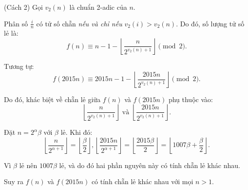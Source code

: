 \documentclass[../06-largest-exponent.tex]{subfiles}
\begin{document}
\begin{soln}(Cách 2)\footnotemark
	Gọi $v_2(n)$ là chuẩn 2-adic của $n$. 
    
	Phân số $\frac{i}{n}$ có tử số chẵn \textit{nếu và chỉ nếu} $v_2(i) > v_2(n)$.
	Do đó, số lượng tử số lẻ là:
	\[
		f(n) \equiv n - 1 - \left\lfloor \frac{n}{2^{v_2(n)+1}} \right\rfloor \pmod{2}.
	\]
        
	Tương tự:
	\[
		f(2015n) \equiv 2015n - 1 - \left\lfloor \frac{2015n}{2^{v_2(n)+1}} \right\rfloor \pmod{2}.
	\]
    
	Do đó, khác biệt về chẵn lẻ giữa $f(n)$ và $f(2015n)$ phụ thuộc vào:
	\[
		\left\lfloor \frac{n}{2^{v_2(n)+1}} \right\rfloor \text{ và } \left\lfloor \frac{2015n}{2^{v_2(n)+1}} \right\rfloor.
	\]

    Đặt $n = 2^\alpha \beta$ với $\beta$ lẻ. Khi đó:
    \[
        \left\lfloor \frac{n}{2^{\alpha + 1}} \right\rfloor = \left\lfloor \frac{\beta}{2} \right\rfloor,
        \left\lfloor \frac{2015n}{2^{\alpha + 1}} \right\rfloor = \left\lfloor \frac{2015\beta}{2} \right\rfloor = \left\lfloor 1007\beta + \frac{\beta}{2} \right\rfloor.
    \]
    
	Vì $\beta$ lẻ nên $1007\beta$ lẻ, và do đó hai phần nguyên này có tính chẵn lẻ khác nhau.

    Suy ra $f(n)$ và $f(2015n)$ có tính chẵn lẻ khác nhau với mọi $n > 1$.
\end{soln}

\end{document}
